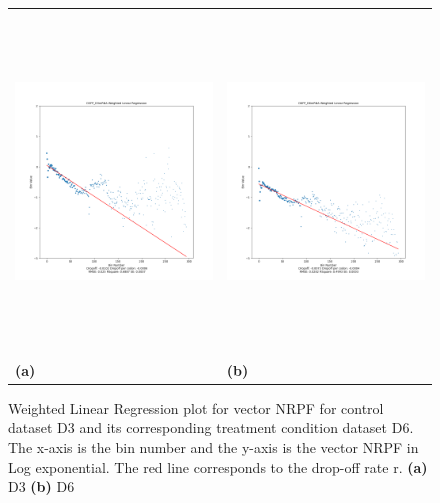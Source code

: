 \documentclass[a4,center,fleqn]{NAR}
\begin{document}
\begin{figure} [ht]
\centering
\begin{tabular}{ll}
\includegraphics[width=9cm,height=9cm]{D3FP_D3mRNA.Log.WLR.png} & \includegraphics[width=9cm,height=9cm]{D6FP_D6mRNA.Log.WLR.png} \\
\textbf{(a)}   & \textbf{(b)}     \\[0.1pt]
\end{tabular}
\caption{Weighted Linear Regression plot for vector NRPF for control dataset D3 and its corresponding treatment condition dataset D6. The x-axis is the bin number and the y-axis is the vector NRPF in Log exponential. The red line corresponds to the drop-off rate r.
\textbf{(a)} D3
\textbf{(b)} D6
}
\label{fig3}
\end{figure} 
 
\end{document}
